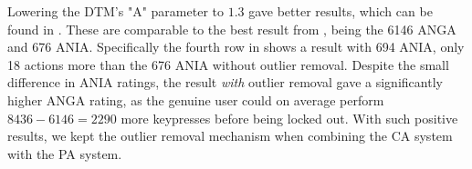 Lowering the DTM's "A" parameter to $1.3$ gave better results, which can be found in .
These are comparable to the best result from , being the 6146 ANGA and 676 ANIA.
Specifically the fourth row in  shows a result with 694 ANIA, only 18 actions more than the 676 ANIA without outlier removal.
Despite the small difference in ANIA ratings, the result \textit{with} outlier removal gave a significantly higher ANGA rating, as the genuine user could on average perform $8436-6146 = 2290$ more keypresses before being locked out.
With such positive results, we kept the outlier removal mechanism when combining the CA system with the PA system.

